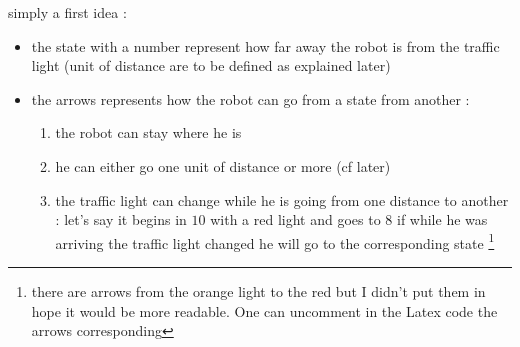 \documentclass{article}
\begin{document}
\begin{center}
    \end{center}
   \newpage
    simply a first idea : 
    \begin{itemize}
    \item the state with a number represent how far away the robot is from the traffic light (unit of distance are to be defined as explained later)
    \item the arrows represents how the robot can go from a state from another :
    \begin{enumerate}
    \item the robot can stay where he is
    \item he can either go one unit of distance or more (cf later)
    \item the traffic light can change while he is going from one distance to another : let's say it begins in $10$ with a red light and goes to $8$ if while he was arriving the traffic light changed he will go to the corresponding state \footnote{there are arrows from the orange light to the red but I didn't put them in hope it would be more readable. One can uncomment in the Latex code the arrows corresponding}
    \end{enumerate}
    \end{itemize}   
\end{document}

